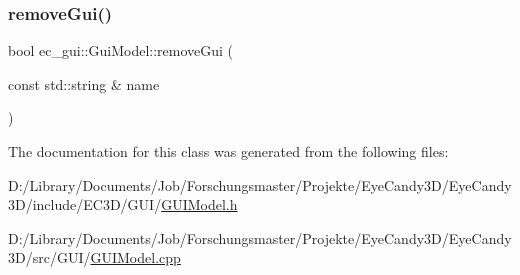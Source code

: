 \mbox{\label{classec__gui_1_1_gui_model_a5fd11ecec934a891542bd1b7538fe258}} 
\subsubsection{\texorpdfstring{remove\+Gui()}{removeGui()}\hspace{0.1cm}{\footnotesize\ttfamily [2/2]}}
{\footnotesize\ttfamily bool ec\+\_\+gui\+::\+Gui\+Model\+::remove\+Gui (\begin{DoxyParamCaption}\item[{const std\+::string \&}]{name }\end{DoxyParamCaption})}



The documentation for this class was generated from the following files\+:\begin{DoxyCompactItemize}
\item 
D\+:/\+Library/\+Documents/\+Job/\+Forschungsmaster/\+Projekte/\+Eye\+Candy3\+D/\+Eye\+Candy3\+D/include/\+E\+C3\+D/\+G\+U\+I/\mbox{\hyperlink{_g_u_i_model_8h}{G\+U\+I\+Model.\+h}}\item 
D\+:/\+Library/\+Documents/\+Job/\+Forschungsmaster/\+Projekte/\+Eye\+Candy3\+D/\+Eye\+Candy3\+D/src/\+G\+U\+I/\mbox{\hyperlink{_g_u_i_model_8cpp}{G\+U\+I\+Model.\+cpp}}\end{DoxyCompactItemize}
